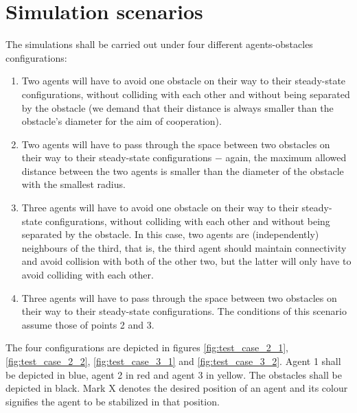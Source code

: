 \section{Simulation scenarios}

The simulations shall be carried out under four different
agents-obstacles configurations:

\begin{enumerate}
  \item Two agents will have to avoid one obstacle on their way to their
    steady-state configurations, without colliding with each other and without
    being separated by the obstacle (we demand that their distance is always
    smaller than the obstacle's diameter for the aim of cooperation).
  \item Two agents will have to pass through the space between two obstacles
    on their way to their steady-state configurations $-$ again, the maximum
    allowed distance between the two agents is smaller than the diameter
    of the obstacle with the smallest radius.
  \item Three agents will have to avoid one obstacle on their way to their
    steady-state configurations, without colliding with each other and without
    being separated by the obstacle. In this case, two agents are
    (independently) neighbours of the third, that is, the third agent should
    maintain connectivity and avoid collision with both of the other two,
    but the latter will only have to avoid colliding with each other.
  \item Three agents will have to pass through the space between two obstacles
    on their way to their steady-state configurations. The conditions of this
    scenario assume those of points 2 and 3.
\end{enumerate}

The four configurations are depicted in figures \eqref{fig:test_case_2_1},
\eqref{fig:test_case_2_2}, \eqref{fig:test_case_3_1} and
\eqref{fig:test_case_3_2}. Agent 1 shall be depicted in blue, agent 2 in
red and agent 3 in yellow. The obstacles shall be depicted in black. Mark X
denotes the desired position of an agent and its colour signifies the agent
to be stabilized in that position.


\noindent{}

